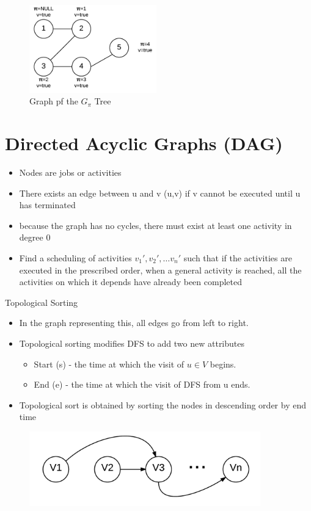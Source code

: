 \documentclass[12pt,letterpaper]{article}
\begin{document}
\begin{figure}[h]
\centering
\includegraphics[width=5.5cm]{dfs6g}
\caption{Graph pf the $G_\pi$ Tree}
\end{figure}
\FloatBarrier
\section{Directed Acyclic Graphs (DAG)}
\begin{itemize}
\item Nodes are jobs or activities
\item There exists an edge between u and v (u,v) if v cannot be executed until u has terminated
\item because the graph has no cycles, there must exist at least one activity in degree 0
\item Find a scheduling of activities $v_1',v_2',\dots v_n'$ such that if the activities are executed in the prescribed order, when a general activity is reached, all the activities on which it depends have already been completed 
\end{itemize}
Topological Sorting
\begin{itemize}
\item In the graph representing this, all edges go from left to right. 
\item Topological sorting modifies DFS to add two new attributes 
\begin{itemize}
\item Start (s) - the time at which the visit of $u\in V$ begins.
\item End (e) - the time at which the visit of DFS from u ends. 
\end{itemize}
\item Topological sort is obtained by sorting the nodes in descending order by end time
\end{itemize}
\begin{figure}[h]
\centering
\includegraphics[width=10cm]{Topological}
\end{figure}
\end{document}
